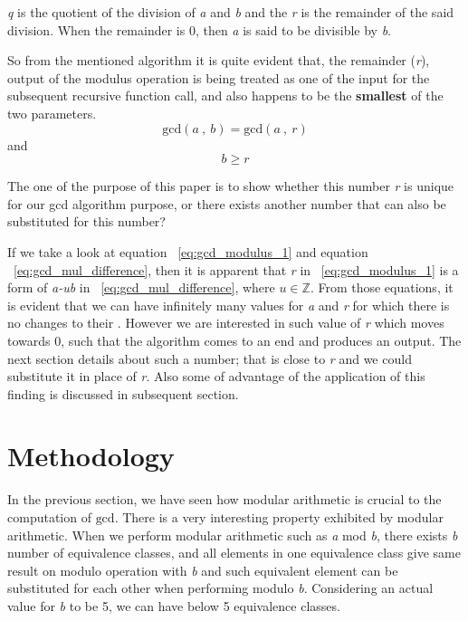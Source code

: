 \documentclass[conference]{IEEEtran}
\newcommand{\Z}{{\mathbb Z}}
\newcommand{\var}[1]{\textit{#1}}
\renewcommand{\gcd}{\text{gcd}}
\begin{document}
\var{q} is the quotient of the division of \var{a} and \var{b} and the \var{r} is the remainder of the said division. When the remainder is 0, then \var{a} is said to be divisible by \var{b}.

So from the mentioned algorithm it is quite evident that, the remainder (\var{r}), output of the modulus operation is being treated as one of the input for the subsequent recursive function call, and also happens to be the \textbf{smallest} of the two parameters.
\begin{equation} \label{eq:gcd_modulus_1}
\gcd(a \>,\> b) = \gcd(a \>, \> r)
\end{equation}
and
\begin{equation*} \label{eq:gcd_modulus_2}
 b \geq r
\end{equation*}

The one of the purpose of this paper is to show whether this number \var{r} is unique for our gcd algorithm purpose, or there exists another number that can also be substituted for this number?

If we take a look at equation ~\ref{eq:gcd_modulus_1} and equation ~\ref{eq:gcd_mul_difference}, then it is apparent that \var {r} in  ~\ref{eq:gcd_modulus_1} is a form of \var{a-ub} in ~\ref{eq:gcd_mul_difference}, where $u\in\Z.$ From those equations, it is evident that we can have infinitely many values for \var {a} and \var {r} for which there is no changes to their \gcd. However we are interested in such value of \var {r} which moves towards 0, such that the algorithm comes to an end and produces an output. The next section details about such a number; that is close to \var {r} and we could substitute it in place of \var {r}. Also some of advantage of the application of this finding is discussed in subsequent section.

\section{Methodology}
In the previous section, we have seen how modular arithmetic is crucial to the computation of $\gcd$. There is a very interesting property exhibited by modular arithmetic.
When we perform modular arithmetic such as \var{a} mod \var{b}, there exists
\var{b} number of equivalence classes, and all elements in one equivalence class give same result on modulo operation with \var{b} and such equivalent element can be substituted for each other when performing modulo \var{b}.
\newline
Considering an actual value for \var{b} to be 5, we can have below 5 equivalence classes.
\end{document}
